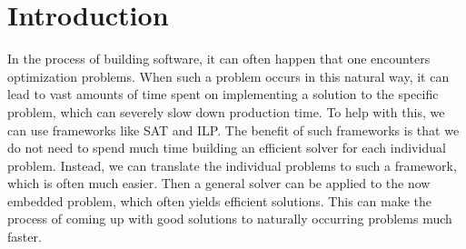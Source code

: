 \chapter{Introduction}


In the process of building software, it can often happen that one encounters optimization problems.
When such a problem occurs in this natural way, it can lead to vast amounts of time spent on implementing a solution to the specific problem, which can severely slow down production time.
To help with this, we can use frameworks like SAT and ILP.
The benefit of such frameworks is that we do not need to spend much time building an efficient solver for each individual problem.
Instead, we can translate the individual problems to such a framework, which is often much easier.
Then a general solver can be applied to the now embedded problem, which often yields efficient solutions.
This can make the process of coming up with good solutions to naturally occurring problems much faster.

